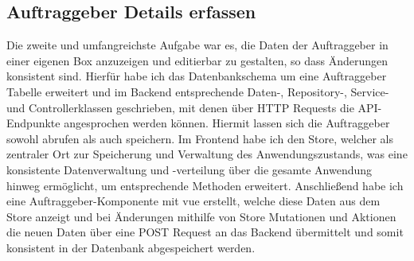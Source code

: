 \subsection{Auftraggeber Details erfassen}
Die zweite und umfangreichste Aufgabe war es, die Daten der Auftraggeber in einer eigenen Box anzuzeigen und editierbar
zu gestalten, so dass Änderungen konsistent sind. Hierfür habe ich das Datenbankschema um eine Auftraggeber Tabelle erweitert
und im Backend entsprechende Daten-, Repository-, Service- und Controllerklassen geschrieben, mit denen über HTTP
Requests die API-Endpunkte angesprochen werden können. Hiermit lassen sich die Auftraggeber sowohl abrufen als auch speichern. Im
Frontend habe ich den Store, welcher als zentraler Ort zur Speicherung und Verwaltung des Anwendungszustands, was eine
konsistente Datenverwaltung und -verteilung über die gesamte Anwendung hinweg ermöglicht, um entsprechende Methoden
erweitert. Anschließend habe ich eine Auftraggeber-Komponente mit vue erstellt, welche diese Daten aus dem Store anzeigt und bei
Änderungen mithilfe von Store Mutationen und Aktionen die neuen Daten über eine POST Request an das Backend übermittelt
und somit konsistent in der Datenbank abgespeichert werden. 



